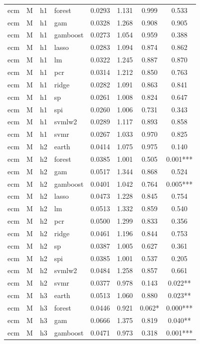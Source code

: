 \begin{ThreePartTable}
\begin{longtable}[t]{llclcccc}
ecm & M & h1 & forest & 0.0293 & 1.131 & 0.999 & 0.533\\
ecm & M & h1 & gam & 0.0328 & 1.268 & 0.908 & 0.905\\
ecm & M & h1 & gamboost & 0.0273 & 1.054 & 0.959 & 0.388\\
ecm & M & h1 & lasso & 0.0283 & 1.094 & 0.874 & 0.862\\
ecm & M & h1 & lm & 0.0322 & 1.245 & 0.887 & 0.870\\
ecm & M & h1 & pcr & 0.0314 & 1.212 & 0.850 & 0.763\\
ecm & M & h1 & ridge & 0.0282 & 1.091 & 0.863 & 0.841\\
ecm & M & h1 & sp & 0.0261 & 1.008 & 0.824 & 0.647\\
ecm & M & h1 & spi & 0.0260 & 1.006 & 0.731 & 0.343\\
ecm & M & h1 & svmlw2 & 0.0289 & 1.117 & 0.893 & 0.858\\
ecm & M & h1 & svmr & 0.0267 & 1.033 & 0.970 & 0.825\\
\addlinespace
ecm & M & h2 & earth & 0.0414 & 1.075 & 0.975 & 0.140\\
ecm & M & h2 & forest & 0.0385 & 1.001 & 0.505 & 0.001***\\
ecm & M & h2 & gam & 0.0517 & 1.344 & 0.868 & 0.524\\
ecm & M & h2 & gamboost & 0.0401 & 1.042 & 0.764 & 0.005***\\
ecm & M & h2 & lasso & 0.0473 & 1.228 & 0.845 & 0.754\\
ecm & M & h2 & lm & 0.0513 & 1.332 & 0.859 & 0.540\\
ecm & M & h2 & pcr & 0.0500 & 1.299 & 0.833 & 0.356\\
ecm & M & h2 & ridge & 0.0461 & 1.196 & 0.844 & 0.753\\
ecm & M & h2 & sp & 0.0387 & 1.005 & 0.627 & 0.361\\
ecm & M & h2 & spi & 0.0385 & 1.001 & 0.537 & 0.205\\
ecm & M & h2 & svmlw2 & 0.0484 & 1.258 & 0.857 & 0.661\\
ecm & M & h2 & svmr & 0.0377 & 0.978 & 0.143 & 0.022**\\
\addlinespace
ecm & M & h3 & earth & 0.0513 & 1.060 & 0.880 & 0.023**\\
ecm & M & h3 & forest & 0.0446 & 0.921 & 0.062* & 0.000***\\
ecm & M & h3 & gam & 0.0666 & 1.375 & 0.819 & 0.040**\\
ecm & M & h3 & gamboost & 0.0471 & 0.973 & 0.318 & 0.001***\\

\end{longtable}
\end{ThreePartTable}
